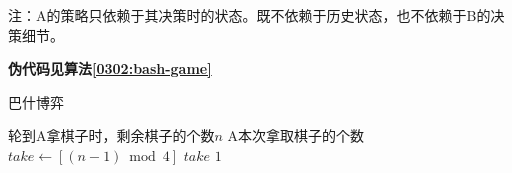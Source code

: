 \begin{questions}
\begin{solution}
        注：A的策略只依赖于其决策时的状态。既不依赖于历史状态，也不依赖于B的决策细节。

        \textbf{伪代码见算法\ref{0302:bash-game}}

    \end{solution}

    \begin{algorithm}[!htp]
        \caption{巴什博弈}\label{0302:bash-game}
        \begin{algorithmic}[1]
            \Require 轮到A拿棋子时，剩余棋子的个数$n$
            \Ensure A本次拿取棋子的个数
            \State $take \gets [(n-1) \bmod 4]$
            \State \Return $take$ 
            \Else
            \State \Return $1$ 
            \EndIf
        \end{algorithmic}
    \end{algorithm}

\end{questions}
